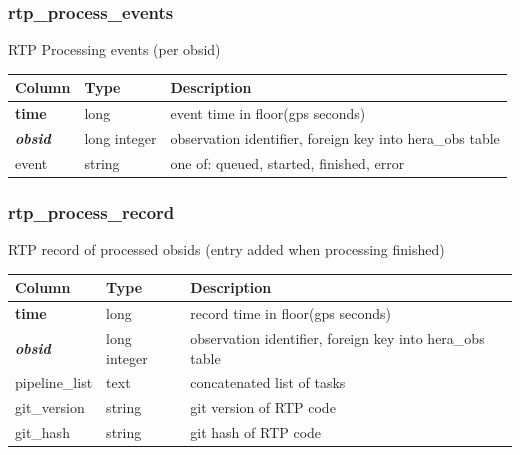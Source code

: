 \documentclass{article}
\begin{document}
\subsubsection{rtp\_process\_events}
RTP Processing events (per obsid)
\begin{center}
 \begin{tabular}{| p{4cm} | p{2cm} | p{10cm} |}
\hline
 {\bf Column} & {\bf Type}  & {\bf Description} \\ [0.5ex]  \hline\hline
\textbf{time} & long & event time in floor(gps seconds) \\ \hline
\textit{\textbf{obsid}} & long integer & observation identifier, foreign key into hera\_obs table \\ \hline
event & string & one of: queued, started, finished, error  \\\hline
\end{tabular}
\end{center}

\subsubsection{rtp\_process\_record}
RTP record of processed obsids (entry added when processing finished)
\begin{center}
 \begin{tabular}{| p{4cm} | p{2cm} | p{10cm} |}
\hline
 {\bf Column} & {\bf Type}  & {\bf Description} \\ [0.5ex]  \hline\hline
\textbf{time} & long & record time in floor(gps seconds)\\ \hline
\textit{\textbf{obsid}} & long integer & observation identifier, foreign key into hera\_obs table \\ \hline
pipeline\_list & text & concatenated list of tasks  \\\hline
git\_version & string & git version of RTP code  \\\hline
git\_hash & string & git hash of RTP code  \\\hline
\end{tabular}
\end{center}
\end{document}
